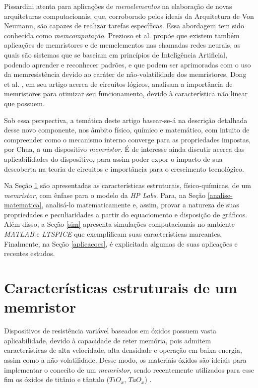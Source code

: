 \documentclass{ceel}
\begin{document}
\begin{multicols}{2}
Pissardini \cite{memcomputacao} atenta para aplicações de \emph{memelementos} na elaboração de novas arquiteturas computacionais, que, corroborado pelos ideais da Arquitetura de Von Neumann, são capazes de realizar tarefas específicas. Essa abordagem tem sido conhecida como \emph{memcomputação}. Prezioso et al. \cite{rneurais} propõe que existem também aplicações de memristores e de memelementos nas chamadas redes neurais, as quais são sistemas que se baseiam em princípios de Inteligência Artificial, podendo aprender e reconhecer padrões, e que podem ser aprimoradas com o uso da memresistência devido ao caráter de não-volatilidade dos memristores. Dong et al. \cite{chines}, em seu artigo acerca de circuitos lógicos, analisam a importância de memristores para otimizar
seu funcionamento, devido à característica não linear que possuem.

Sob essa perspectiva, a temática deste artigo basear-se-á na descrição detalhada desse novo componente, nos âmbito físico, químico e matemático, com intuito de compreender como o mecanismo interno converge para as propriedades impostas,  por Chua, a um dispositivo \emph{memristor}. É de interesse ainda discutir acerca das aplicabilidades do dispositivo, para assim poder expor o impacto de sua descoberta na teoria de circuitos e importância para o crescimento tecnológico. %

Na Seção \ref{estrutura} são apresentadas as características estruturais, físico-químicas, de um \emph{memristor}, com ênfase para o modelo da \emph{HP Labs}. Para, na Seção \ref{analise-matematica}, analisá-lo matematicamente e, assim, provar a natureza de suas propriedades e peculiaridades a partir do equaciomento e disposição de gráficos. Além disso, a Seção \ref{sim} apresenta simulações computacionais no ambiente \emph{MATLAB}
 e \emph{LTSPICE} 
que exemplificam suas características marcantes. Finalmente, na Seção \ref{aplicacoes}, é explicitada algumas de suas aplicações e recentes estudos.


\section{Características estruturais de um memristor} \label{estrutura}
Dispositivos de resistência variável baseados em óxidos 
possuem vasta aplicabilidade, devido à capacidade de reter memória, pois
admitem características de alta velocidade, alta densidade e operação em baixa energia, 
assim como a não-volatilidade. Desse modo, os materiais óxidos são ideiais para implementar o conceito de um \emph{memristor}, sendo recentemente utilizados para esse fim os óxidos de titânio e tântalo ($TiO_x$, $TaO_x$) \cite{conceito}. %


\end{multicols}
\end{document}
